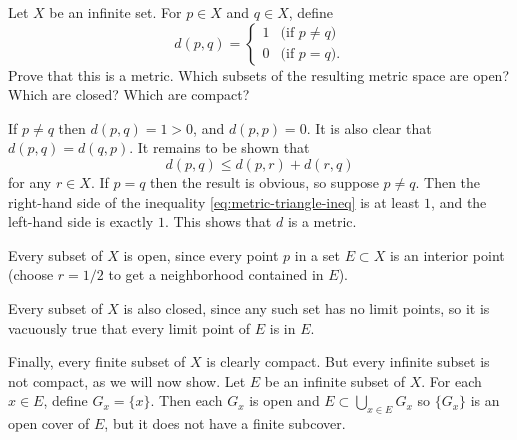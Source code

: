  Let $X$ be an infinite set. For $p\in X$ and $q\in X$,
define
\begin{equation*}
  d(p,q) =
  \begin{cases}
    1 & \text{(if $p\neq q$)} \\
    0 & \text{(if $p = q$)}.
  \end{cases}
\end{equation*}
Prove that this is a metric. Which subsets of the resulting metric
space are open? Which are closed? Which are compact?
\begin{solution}
  If $p\neq q$ then $d(p,q) = 1 > 0$, and $d(p,p) = 0$. It is also
  clear that $d(p,q) = d(q,p)$. It remains to be shown that
  \begin{equation}
    \label{eq:metric-triangle-ineq}
    d(p,q)\leq d(p,r)+d(r,q)
  \end{equation}
  for any $r\in X$. If $p = q$ then the result is obvious, so suppose
  $p\neq q$. Then the right-hand side of the inequality
  \eqref{eq:metric-triangle-ineq} is at least $1$, and the left-hand
  side is exactly $1$. This shows that $d$ is a metric.

  Every subset of $X$ is open, since every point $p$ in a set
  $E\subset X$ is an interior point (choose $r = 1/2$ to get a
  neighborhood contained in $E$).

  Every subset of $X$ is also closed, since any such set has no limit
  points, so it is vacuously true that every limit point of $E$ is in
  $E$.

  Finally, every finite subset of $X$ is clearly compact. But every
  infinite subset is not compact, as we will now show. Let $E$ be an
  infinite subset of $X$. For each $x\in E$, define $G_x =
  \{x\}$. Then each $G_x$ is open and $E\subset\bigcup_{x\in E} G_x$
  so $\{G_x\}$ is an open cover of $E$, but it does not have a finite
  subcover.
\end{solution}

